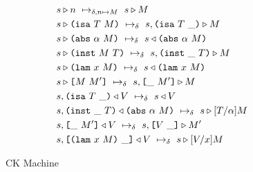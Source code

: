 \documentclass[../main.tex]{subfiles}
\begin{document}
\begin{figure*}[t]
    
    \begin{align*}
        &\cksteps{\delta, n \mapsto M}{\ckforward{s}{n}}{\ckforward{s}{M}}\\
        &\cksteps{\delta}{\ckforward{s}{\ann{M}{T}}}{\ckforward{s, \inAnnLeftFrame{T}}{M}}\\
        &\cksteps{\delta}{\ckforward{s}{\abs{\alpha}{M}}}{\ckbackward{s}{\abs{\alpha}{M}}}\\
        &\cksteps{\delta}{\ckforward{s}{\inst{M}{T}}}{\ckforward{s, \inInstLeftFrame{T}}{M}}\\
        &\cksteps{\delta}{\ckforward{s}{\lam{x}{M}}}{\ckbackward{s}{\lam{x}{M}}}\\
        &\cksteps{\delta}{\ckforward{s}{\app{M}{M'}}}{\ckforward{s, \inAppLeftFrame{M'}}{M}}\\
        &\cksteps{\delta}{\ckbackward{s, \inAnnLeftFrame{T}}{V}}{\ckbackward{s}{V}}\\
        &\cksteps{\delta}{\ckbackward{s, \inInstLeftFrame{T}}{\abs{\alpha}{M}}}{\ckforward{s}{\subst{T}{\alpha}{M}}}\\
        &\cksteps{\delta}{\ckbackward{s, \inAppLeftFrame{M'}}{V}}{\ckforward{s, \inAppRightFrame{V}}{M'}}\\
        &\cksteps{\delta}{\ckbackward{s, \inAppRightFrame{\lam{x}{M}}}{V}}{\ckforward{s}{\subst{V}{x}{M}}}\\
    \end{align*}
    
    \caption{CK Machine}
    \label{fig:Plutus_core_ck_machine}
\end{figure*}
\end{document}
